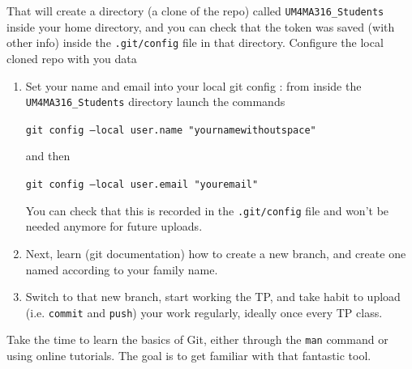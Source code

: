 \documentclass[a4paper,12pt]{article}
\begin{document}
That will create a directory (a clone of the repo) called {\tt UM4MA316\_Students} inside your home
directory, and you can check that the token was saved (with other info) 
inside the {\tt .git/config} file in that directory. Configure the local cloned 
repo with you data 
\begin{enumerate}
	\item
		Set your name and email into your local git config : from inside
		the {\tt UM4MA316\_Students} directory launch the commands
		\begin{center}
		{\tt git config --local user.name "yournamewithoutspace"}
		\end{center}
		and then 
		\begin{center}
		{\tt git config --local user.email "youremail"}
		\end{center}
		You can check that this is recorded in the {\tt .git/config}
		file and won't be needed anymore for future uploads.
	\item Next, learn (git documentation) how to create a new branch, and
		create one named according to your family name.   
	\item Switch to that new branch, start working the TP, and take habit to
		upload (i.e. {\tt commit} and {\tt push}) your work regularly,
		ideally once every TP class. 
\end{enumerate}
Take the time to learn the basics of Git, either through the {\tt man} command 
or using online tutorials. 
The goal is to get familiar with that fantastic tool.
\end{document}
